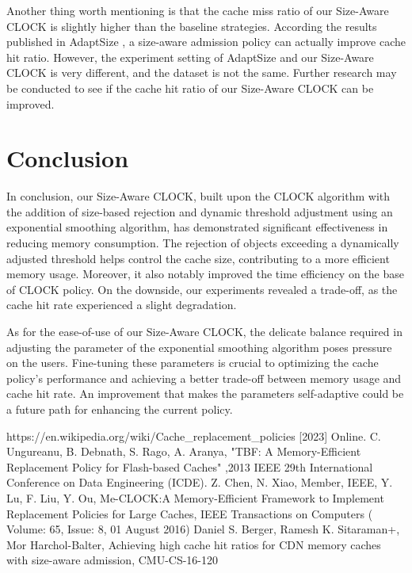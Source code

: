 \documentclass[journal,10.5pt,onecolumn]{IEEEtran}
\begin{document}
Another thing worth mentioning is that the cache miss ratio of our Size-Aware CLOCK is slightly higher than the baseline strategies. According the results published in AdaptSize \cite{b4}, a size-aware admission policy can actually improve cache hit ratio. However, the experiment setting of AdaptSize and our Size-Aware CLOCK is very different, and the dataset is not the same. Further research may be conducted to see if the cache hit ratio of our Size-Aware CLOCK can be improved.

\section{Conclusion}
In conclusion, our Size-Aware CLOCK, built upon the CLOCK algorithm with the addition of size-based rejection and dynamic threshold adjustment using an exponential smoothing algorithm, has demonstrated significant effectiveness in reducing memory consumption. The rejection of objects exceeding a dynamically adjusted threshold helps control the cache size, contributing to a more efficient memory usage. Moreover, it also notably improved the time efficiency on the base of CLOCK policy. On the downside, our experiments revealed a trade-off, as the cache hit rate experienced a slight degradation.

As for the ease-of-use of our Size-Aware CLOCK, the delicate balance required in adjusting the parameter of the exponential smoothing algorithm poses pressure on the users. Fine-tuning these parameters is crucial to optimizing the cache policy's performance and achieving a better trade-off between memory usage and cache hit rate. An improvement that makes the parameters self-adaptive could be a future path for enhancing the current policy.


\begin{thebibliography}{00}
	 https://en.wikipedia.org/wiki/Cache\_replacement\_policies [2023] Online.
	 C. Ungureanu, B. Debnath, S. Rago, A. Aranya, "TBF: A Memory-Efficient Replacement Policy for Flash-based Caches" ,2013 IEEE 29th International Conference on Data Engineering (ICDE). 
	 Z. Chen, N. Xiao, Member, IEEE, Y. Lu, F. Liu, Y. Ou, Me-CLOCK:A Memory-Efficient Framework to Implement Replacement Policies for Large Caches, IEEE Transactions on Computers ( Volume: 65, Issue: 8, 01 August 2016)
	 Daniel S. Berger, Ramesh K. Sitaraman+, Mor Harchol-Balter, Achieving high cache hit ratios for CDN memory caches with size-aware admission, CMU-CS-16-120
\end{thebibliography}
\end{document}
